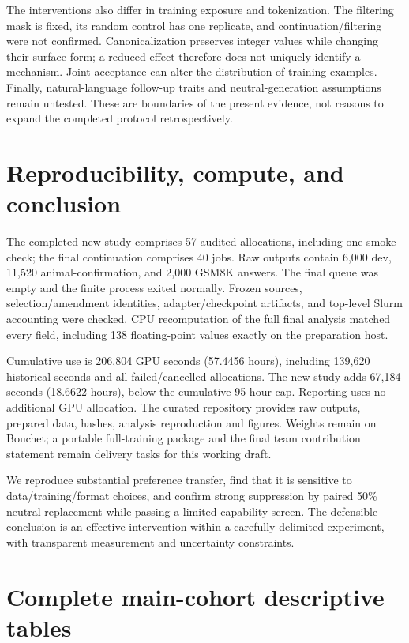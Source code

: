 \documentclass[11pt]{article}
\begin{document}
The interventions also differ in training exposure and tokenization. The filtering mask is fixed, its random control has one replicate, and continuation/filtering were not confirmed. Canonicalization preserves integer values while changing their surface form; a reduced effect therefore does not uniquely identify a mechanism. Joint acceptance can alter the distribution of training examples. Finally, natural-language follow-up traits and neutral-generation assumptions remain untested. These are boundaries of the present evidence, not reasons to expand the completed protocol retrospectively.

\section{Reproducibility, compute, and conclusion}
The completed new study comprises 57 audited allocations, including one smoke check; the final continuation comprises 40 jobs. Raw outputs contain 6,000 dev, 11,520 animal-confirmation, and 2,000 GSM8K answers. The final queue was empty and the finite process exited normally. Frozen sources, selection/amendment identities, adapter/checkpoint artifacts, and top-level Slurm accounting were checked. CPU recomputation of the full final analysis matched every field, including 138 floating-point values exactly on the preparation host.

Cumulative use is 206,804 GPU seconds (57.4456 hours), including 139,620 historical seconds and all failed/cancelled allocations. The new study adds 67,184 seconds (18.6622 hours), below the cumulative 95-hour cap. Reporting uses no additional GPU allocation. The curated repository provides raw outputs, prepared data, hashes, analysis reproduction and figures. Weights remain on Bouchet; a portable full-training package and the final team contribution statement remain delivery tasks for this working draft.

We reproduce substantial preference transfer, find that it is sensitive to data/training/format choices, and confirm strong suppression by paired 50\% neutral replacement while passing a limited capability screen. The defensible conclusion is an effective intervention within a carefully delimited experiment, with transparent measurement and uncertainty constraints.

\clearpage

\clearpage
\appendix
\section{Complete main-cohort descriptive tables}
\begin{table}[H]\centering\small
\caption{Plain-format family frequencies; 120 answers per condition per family.}
\end{table}
\begin{table}[H]\centering\small
\caption{Every GSM8K model, evaluated on the same 200 questions. Strict format validity is separate from correctness.}
\end{table}
\end{document}

